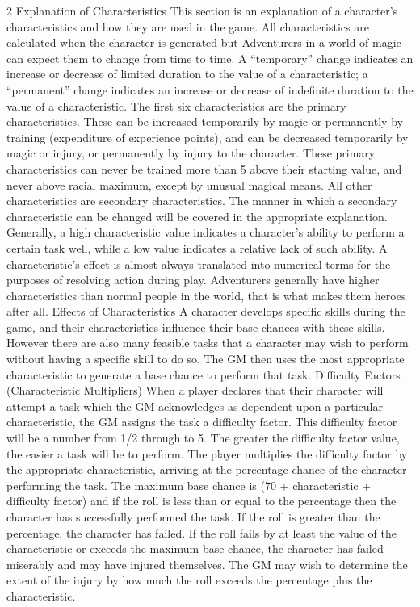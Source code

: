 \documentclass[a4paper]{article}
\begin{document}
\begin{multicols}{3}
2 Explanation of Characteristics
This section is an explanation of a character’s
characteristics and how they are used in the game.
All characteristics are calculated when the character is generated but Adventurers in a world of
magic can expect them to change from time to
time. A “temporary” change indicates an increase
or decrease of limited duration to the value of a
characteristic; a “permanent” change indicates an
increase or decrease of indefinite duration to the
value of a characteristic.
The first six characteristics are the primary characteristics. These can be increased temporarily by
magic or permanently by training (expenditure of
experience points), and can be decreased temporarily by magic or injury, or permanently by injury to
the character. These primary characteristics can
never be trained more than 5 above their starting
value, and never above racial maximum, except by
unusual magical means.
All other characteristics are secondary characteristics. The manner in which a secondary characteristic can be changed will be covered in the appropriate explanation.
Generally, a high characteristic value indicates a
character’s ability to perform a certain task well,
while a low value indicates a relative lack of such
ability. A characteristic’s effect is almost always
translated into numerical terms for the purposes of
resolving action during play. Adventurers generally
have higher characteristics than normal people in
the world, that is what makes them heroes after all.
Effects of Characteristics
A character develops specific skills during the
game, and their characteristics influence their base
chances with these skills. However there are also
many feasible tasks that a character may wish to
perform without having a specific skill to do so.
The GM then uses the most appropriate characteristic to generate a base chance to perform that task.
Difficulty Factors (Characteristic Multipliers)
When a player declares that their character will
attempt a task which the GM acknowledges as
dependent upon a particular characteristic, the GM
assigns the task a difficulty factor. This difficulty
factor will be a number from 1/2 through to 5.
The greater the difficulty factor value, the easier a
task will be to perform.
The player multiplies the difficulty factor by the
appropriate characteristic, arriving at the percentage chance of the character performing the task.
The maximum base chance is (70 + characteristic +
difficulty factor)%
and if the roll is less than or equal to the percentage
then the character has successfully performed the
task. If the roll is greater than the percentage, the
character has failed. If the roll fails by at least the
value of the characteristic or exceeds the maximum
base chance, the character has failed miserably and
may have injured themselves. The GM may wish
to determine the extent of the injury by how much
the roll exceeds the percentage plus the characteristic.


\end{multicols}
\end{document}
